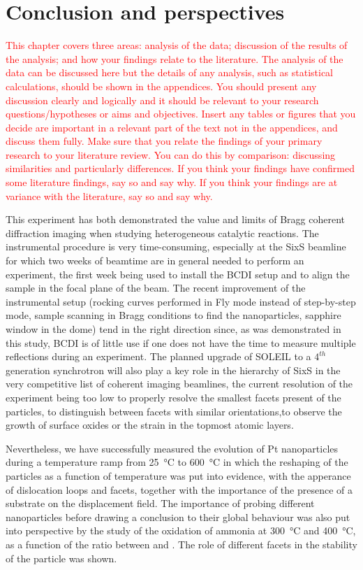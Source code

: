\section{Conclusion and perspectives}

\textcolor{red}{This chapter covers three areas: analysis of the data; discussion of the results of the analysis; and how your findings relate to the literature. The analysis of the data can be discussed here but the details of any analysis, such as statistical calculations, should be shown in the appendices. You should present any discussion clearly and logically and it should be relevant to your research questions/hypotheses or aims and objectives. Insert any tables or figures that you decide are important in a relevant part of the text not in the appendices, and discuss them fully. Make sure that you relate the findings of your primary research to your literature review. You can do this by comparison: discussing similarities and particularly differences. If you think your findings have confirmed some literature findings, say so and say why. If you think your findings are at variance with the literature, say so and say why.}

This experiment has both demonstrated the value and limits of Bragg coherent diffraction imaging when studying heterogeneous catalytic reactions.
The instrumental procedure is very time-consuming, especially at the SixS beamline for which two weeks of beamtime are in general needed to perform an experiment, the first week being used to install the BCDI setup and to align the sample in the focal plane of the beam.
The recent improvement of the instrumental setup (rocking curves performed in Fly mode instead of step-by-step mode, sample scanning in Bragg conditions to find the nanoparticles, sapphire window in the dome) tend in the right direction since, as was demonstrated in this study, BCDI is of little use if one does not have the time to measure multiple reflections during an experiment.
The planned upgrade of SOLEIL to a $4^{th}$ generation synchrotron will also play a key role in the hierarchy of SixS in the very competitive list of coherent imaging beamlines, the current resolution of the experiment being too low to properly resolve the smallest facets present of the particles, to distinguish between facets with similar orientations,to observe the growth of surface oxides or the strain in the topmost atomic layers.

Nevertheless, we have successfully measured the evolution of Pt nanoparticles during a temperature ramp from \qty{25}{\degreeCelsius} to \qty{600}{\degreeCelsius} in which the reshaping of the particles as a function of temperature was put into evidence, with the apperance of dislocation loops and facets, together with the importance of the presence of a substrate on the displacement field.
The importance of probing different nanoparticles before drawing a conclusion to their global behaviour was also put into perspective by the study of the oxidation of ammonia at \qty{300}{\degreeCelsius} and \qty{400}{\degreeCelsius}, as a function of the ratio between \argon and \ammonia.
The role of different facets in the stability of the particle was shown.

